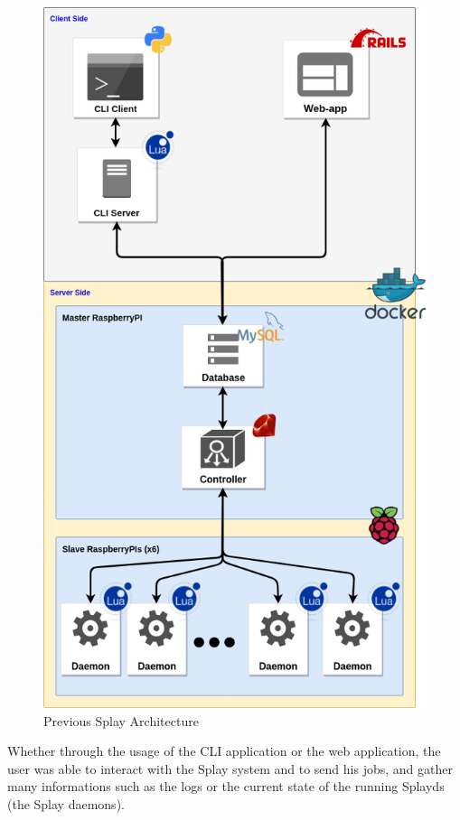 \documentclass{eplmastersthesis}
\begin{document}
        \begin{figure}[H]
          \centering
          \includegraphics[scale=0.6]{figures/prev_arch.png}
          \caption{\label{prev_arch} Previous Splay Architecture}
        \end{figure}

        Whether through the usage of the CLI application or the web application,
        the user was able to interact with the Splay system and to send his
        jobs, and gather many informations such as the logs or the current
        state of the running Splayds (the Splay daemons).
\end{document}
